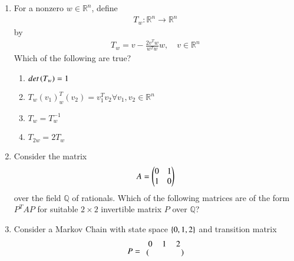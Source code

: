 \begin{enumerate}[label=\thesection.\arabic*.,ref=\thesection.\theenumi]
\begin{enumerate}
\end{enumerate}
\item For a nonzero $w \in \mathbb{R}^n$, define
\begin{align}
T_w: \mathbb{R}^n \to \mathbb{R}^n
\end{align}
by
\begin{align}
T_w = v - \frac{2v^Tw}{w^Tw}w, \quad v \in \mathbb{R}^n
\end{align}
Which of the following are true?
\begin{enumerate}
\item $det\left(T_w\right) = 1$
\item $T_w(v_1)^T_w(v_2) = v_1^Tv_2 \forall v_1, v_2 \in \mathbb{R}^n$
\item  $T_w = T_w ^{-1}$
\item  $T_{2w} = 2T_{w}$
\end{enumerate}
\item Consider the matrix 
\begin{align}
A = \begin{pmatrix}0 & 1 \\ 1 & 0\end{pmatrix}
\end{align}
over the field $\mathbb{Q}$ of rationals.  Which of the following matrices are of the form $P^TAP$ for suitable $2\times 2$ invertible matrix $P$ over $\mathbb{Q}$?
\begin{enumerate}
\end{enumerate}
\item Consider a Markov Chain with state space $\left\{0,1,2\right\}$ and transition matrix
\begin{align}
P = 
\begin{blockarray}{c@{\hspace{1pt}}rrr@{\hspace{3pt}}}
         & 0   & 1   & 2 \\
        \begin{block}{r@{\hspace{3pt}}@{\hspace{1pt}}
    (@{\hspace{1pt}}rrr@{\hspace{1pt}}@{\hspace{1pt}})}

\end{block}
\end{blockarray}
\end{align}
\end{enumerate}
